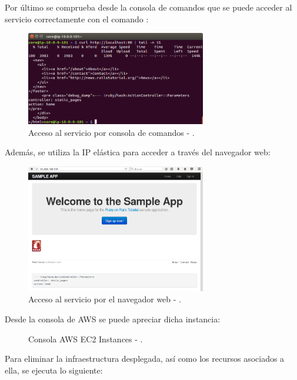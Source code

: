 Por último se comprueba desde la consola de comandos que se puede acceder al servicio correctamente con el comando :


\begin{figure}[H]
\centering
\includegraphics[width=0.7\textwidth]{images/figures/curl-aws-1.png}
\caption{Acceso al servicio por consola de comandos - .}
\end{figure}

Además, se utiliza la IP elástica para acceder a través del navegador web:

\begin{figure}[H]
\centering
\includegraphics[width=0.7\textwidth]{images/figures/access-aws-1.png}
\caption{Acceso al servicio por el navegador web - .}
\end{figure}

Desde la consola de AWS se puede apreciar dicha instancia:

\begin{figure}[H]
\caption{Consola AWS EC2 Instances - .}
\end{figure}

Para eliminar la infraestructura desplegada, así como los recursos asociados a ella, se ejecuta lo siguiente:

